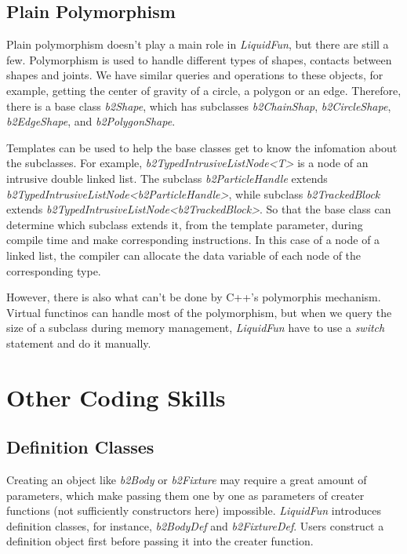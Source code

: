 \documentclass[UTF8]{ctexart}
\begin{document}
        \subsection{Plain Polymorphism}

            Plain polymorphism doesn't play a main role in \textit{LiquidFun}, but there are still a few. Polymorphism is used to handle different types of shapes, contacts between shapes and joints. We have similar queries and operations to these objects, for example, getting the center of gravity of a circle, a polygon or an edge. Therefore, there is a base class \textit{b2Shape}, which has subclasses \textit{b2ChainShap}, \textit{b2CircleShape}, \textit{b2EdgeShape}, and \textit{b2PolygonShape}.

            Templates can be used to help the base classes get to know the infomation about the subclasses. For example, \textit{b2TypedIntrusiveListNode<T>} is a node of an intrusive double linked list. The subclass \textit{b2ParticleHandle} extends \textit{b2TypedIntrusiveListNode<b2ParticleHandle>}, while subclass \textit{b2TrackedBlock} extends \textit{b2TypedIntrusiveListNode<b2TrackedBlock>}. So that the base class can determine which subclass extends it, from the template parameter, during compile time and make corresponding instructions. In this case of a node of a linked list, the compiler can allocate the data variable of each node of the corresponding type.

            However, there is also what can't be done by C++'s polymorphis mechanism. Virtual functinos can handle most of the polymorphism, but when we query the size of a subclass during memory management, \textit{LiquidFun} have to use a \textit{switch} statement and do it manually.

    \section{Other Coding Skills}
        
        \subsection{Definition Classes}

            Creating an object like \textit{b2Body} or \textit{b2Fixture} may require a great amount of parameters, which make passing them one by one as parameters of creater functions (not sufficiently constructors here) impossible. \textit{LiquidFun} introduces definition classes, for instance, \textit{b2BodyDef} and \textit{b2FixtureDef}. Users construct a definition object first before passing it into the creater function.
\end{document}
